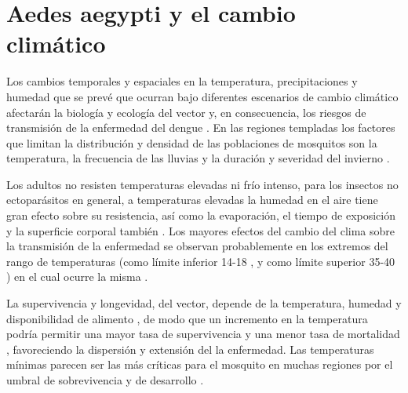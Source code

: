 \section{Aedes aegypti y el cambio climático}
\label{sec:cap-3-cambio-climatico}
Los cambios temporales y espaciales en la temperatura, precipitaciones y humedad que se prevé que
ocurran bajo diferentes escenarios de cambio climático afectarán la biología y ecología del vector
y, en consecuencia, los riesgos de transmisión de la enfermedad del dengue \cite{dengueUruguayCap2}
.  En las regiones templadas los factores que limitan la distribución y densidad de las poblaciones
de mosquitos son la temperatura, la frecuencia de las lluvias y la duración y severidad del
invierno \cite{ThironIzcazaJ2003}.

Los adultos no resisten temperaturas elevadas ni frío intenso, para los insectos no ectoparásitos
en general, a temperaturas elevadas la humedad en el aire tiene gran efecto sobre su resistencia,
así como la evaporación, el tiempo de exposición y la superficie corporal también
\cite{ThironIzcazaJ2003}. Los mayores efectos del cambio del clima sobre la transmisión de la
enfermedad se observan probablemente en los extremos del rango de temperaturas (como límite
inferior 14-18 \textcelsius, y como límite superior 35-40 \textcelsius ) en el cual ocurre la misma
\cite{dengueUruguayCap2}.

La supervivencia y longevidad, del vector, depende de la temperatura, humedad y disponibilidad de
alimento \cite{ThironIzcazaJ2003}, de modo que un incremento en la temperatura podría permitir una
mayor tasa de supervivencia y una menor tasa de mortalidad \cite{dengueUruguayCap2}, favoreciendo
la dispersión y extensión del la enfermedad. Las temperaturas mínimas parecen ser las más críticas
para el mosquito en muchas regiones por el umbral de sobrevivencia y de desarrollo
\cite{dengueUruguayCap2}.
